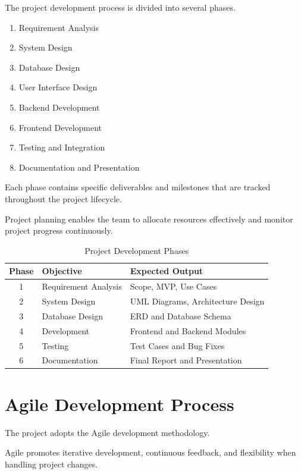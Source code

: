 The project development process is divided into several phases.

\begin{enumerate}
	\item Requirement Analysis
	\item System Design
	\item Database Design
	\item User Interface Design
	\item Backend Development
	\item Frontend Development
	\item Testing and Integration
	\item Documentation and Presentation
\end{enumerate}

Each phase contains specific deliverables and milestones that are tracked throughout the project lifecycle.

Project planning enables the team to allocate resources effectively and monitor project progress continuously.

\begin{table}[H]
	\centering
	\caption{Project Development Phases}
	\begin{tabular}{|c|p{4cm}|p{7cm}|}
		\hline
		\textbf{Phase} & \textbf{Objective} & \textbf{Expected Output} \\
		\hline
		1 & Requirement Analysis & Scope, MVP, Use Cases \\
		\hline
		2 & System Design & UML Diagrams, Architecture Design \\
		\hline
		3 & Database Design & ERD and Database Schema \\
		\hline
		4 & Development & Frontend and Backend Modules \\
		\hline
		5 & Testing & Test Cases and Bug Fixes \\
		\hline
		6 & Documentation & Final Report and Presentation \\
		\hline
	\end{tabular}
\end{table}

\section{Agile Development Process}

The project adopts the Agile development methodology.

Agile promotes iterative development, continuous feedback, and flexibility when handling project changes.


